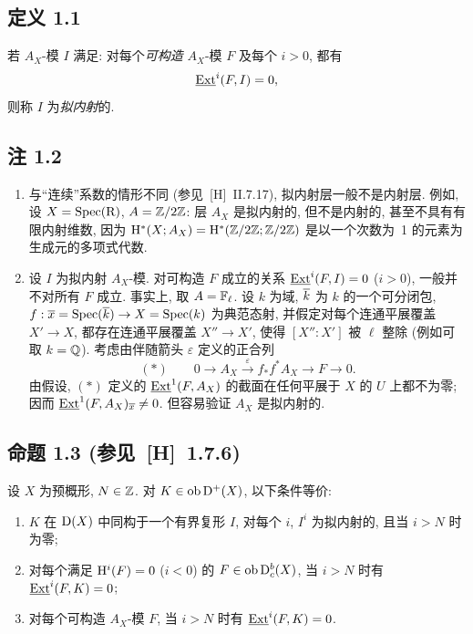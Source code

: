 \subsection*{定义 1.1}
若 $A_X$-模 $I$ 满足: 对每个\emph{可构造} $A_X$-模 $F$ 及每个 $i > 0$, 都有
\[
\underline{\operatorname{Ext}}^i(F,I) = 0,
\]
则称 $I$ 为\emph{拟内射}的.

\subsection*{注 1.2}
\begin{enumerate}[label=\alph*)]
\item 与“连续”系数的情形不同 (参见~[H]~II.7.17), 拟内射层一般不是内射层. 例如, 设 $X = \operatorname{Spec}(\mathrm R)$, $A = \mathbb Z/2\mathbb Z$: 层 $A_X$ 是拟内射的, 但不是内射的, 甚至不具有有限内射维数, 因为 $\mathrm{H}^{*}(X; A_X) = \mathrm{H}^{*}(\mathbb Z/2\mathbb Z; \mathbb Z/2\mathbb Z)$ 是以一个次数为~1 的元素为生成元的多项式代数.

\item 设 $I$ 为拟内射 $A_X$-模. 对可构造 $F$ 成立的关系 $\underline{\operatorname{Ext}}^i(F,I) = 0$ ($i > 0$), 一般并不对所有 $F$ 成立. 事实上, 取 $A = \mathbb{F}_{\ell}$. 设 $k$ 为域, $\overline{k}$ 为 $k$ 的一个可分闭包, $f : \overline{x} = \operatorname{Spec}(\overline{k}) \to X = \operatorname{Spec}(k)$ 为典范态射, 并假定对每个连通平展覆盖 $X' \to X$, 都存在连通平展覆盖 $X'' \to X'$, 使得 $[X'':X']$ 被 $\ell$ 整除 (例如可取 $k = \mathbb{Q}$). 考虑由伴随箭头 $\varepsilon$ 定义的正合列
\[
(*) \qquad 0 \longrightarrow A_X \xrightarrow{\;\varepsilon\;} f_{*}f^{*}A_X \longrightarrow F \longrightarrow 0.
\]
由假设, $(*)$ 定义的 $\underline{\operatorname{Ext}}^1(F,A_X)$ 的截面在任何平展于 $X$ 的 $U$ 上都不为零; 因而 $\underline{\operatorname{Ext}}^1(F,A_X)_{\overline{x}} \neq\allowbreak  0$. 但容易验证 $A_X$ 是拟内射的.
\end{enumerate}

\subsection*{命题 1.3 {\normalfont (参见~[H]~1.7.6)}}
设 $X$ 为预概形, $N \in \mathbb Z$. 对 $K \in \operatorname{ob} \mathrm{D}^{+}(X)$, 以下条件等价:
\begin{enumerate}[label=(\roman*)]
\item $K$ 在 $\mathrm{D}(X)$ 中同构于一个有界复形 $I$, 对每个 $i$, $I^i$ 为拟内射的, 且当 $i > N$ 时为零;
\item 对每个满足 $\mathrm{H}^i(F) = 0$ ($i < 0$) 的 $F \in \operatorname{ob} \mathrm{D}_c^{b}(X)$, 当 $i > N$ 时有 $\underline{\operatorname{Ext}}^i(F,K) = 0$;
\item 对每个可构造 $A_X$-模 $F$, 当 $i > N$ 时有 $\underline{\operatorname{Ext}}^i(F,K) = 0$.
\end{enumerate}

